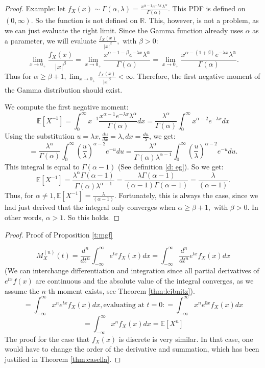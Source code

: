 \begin{proof}\label{p:negative}
    Example: let \(f_X(x) \sim \Gamma(\alpha, \lambda) = 
    \displaystyle \frac{x^{\alpha -1} e^{-\lambda x} \lambda^\alpha} {\Gamma(\alpha)}.\) This PDF is defined on \((0, \infty)\). So the function is not defined on \(\mathbb{R}\). This, however, is not a problem, as we can just evaluate the right limit. Since the Gamma function already uses \(\alpha\) as a parameter, we will evaluate \( \displaystyle \frac{f_X(x)}{|x|^\beta}, \text{ with }\beta > 0\):
    \[\lim_{x \to 0_+} \frac{f_X(x)}{|x|^\beta} = \lim_{x \to 0_+} \frac{x^{\alpha -1 - \beta} e^{-\lambda x} \lambda^\alpha} {\Gamma(\alpha)} = \lim_{x \to 0_+} \frac{x^{\alpha -(1 + \beta)} e^{-\lambda x} \lambda^\alpha} {\Gamma(\alpha)} .\] Thus for \(\alpha \geq \beta + 1, \lim_{x \to 0_+} \frac{f_X(x)}{|x|^\beta} < \infty\). Therefore, the first negative moment of the Gamma distribution should exist.

    We compute the first negative moment: 
    \[ \mathbb{E}[X^{-1}] = \int_{0}^{\infty} x^{-1} \frac{x^{\alpha -1} e^{-\lambda x} \lambda^\alpha} {\Gamma(\alpha)} dx = \frac{\lambda^\alpha}{\Gamma(\alpha)} \int_{0}^{\infty} x^{\alpha - 2} e^{-\lambda x} dx\]
    Using the substitution \(\displaystyle u = \lambda x, \frac{du}{dx} = \lambda, dx = \frac{du}{\lambda}\), we get:
    \[ = \frac{\lambda^\alpha}{\Gamma(\alpha)} \int_{0}^{\infty}\left(\frac{u}{\lambda}\right)^{\alpha -2} e^{-u} du = \frac{\lambda^\alpha}{\Gamma(\alpha) \lambda^{\alpha-1}} \int_{0}^{\infty}\left(\frac{u}{\lambda}\right)^{\alpha -2} e^{-u} du.\] This integral is equal to \(\Gamma(\alpha - 1)\) (See definition \ref{d: eg}). So we get: 
    \[\mathbb{E}[X^{-1}] = \frac{\lambda^\alpha \Gamma(\alpha - 1) }{\Gamma(\alpha) \lambda^{\alpha-1}} = \frac{\lambda \Gamma(\alpha - 1)}{(\alpha -1)\Gamma(\alpha - 1)} = \frac{\lambda}{(\alpha -1)}.\] Thus, for \(\alpha \neq 1, \mathbb{E}[X^{-1}] = \frac{\lambda}{(\alpha -1)}\). Fortunately, this is always the case, since we had just derived that the integral only converges when \(\alpha \geq \beta + 1, \text{ with } \beta > 0\). In other words, \(\alpha > 1\). So this holds.
\end{proof}

\begin{proof} Proof of Proposition \ref{t:mgf}

    \[M_X^{(n)}(t) = \frac{d^n}{dt^n} \int_{-\infty}^{\infty} e^{tx} f_X(x) dx = \int_{-\infty}^{\infty} \frac{d^n}{dt^n} e^{tx} f_X(x) dx\] (We can interchange differentiation and integration since all partial derivatives of \(e^{tx} f(x)\) are continuous and the absolute value of the integral converges, as we assume the \(n\)-th moment exists, see Theorem \ref{thm:leibnitz}).
    \[ = \int_{-\infty}^{\infty} x^n e^{tx} f_X(x) dx, \text{evaluating at } t = 0: = \int_{-\infty}^{\infty} x^n e^{0x} f_X(x) dx\]
    \[ = \int_{-\infty}^{\infty} x^n f_X(x) dx = \mathbb{E}[X^n]\]
    The proof for the case that \(f_X(x)\) is discrete is very similar. In that case, one would have to change the order of the derivative and summation, which has been justified in Theorem \ref{thm:casella}.
\end{proof}

